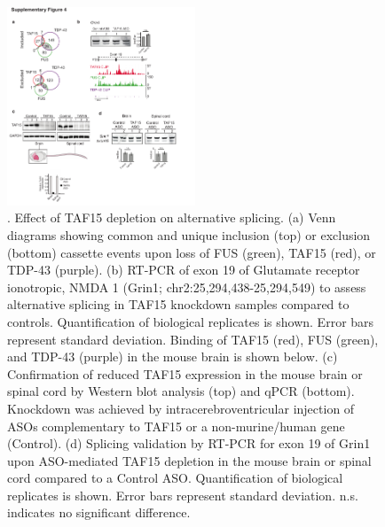 \begin{figure}[ht]
  \centering
  \includegraphics[width=0.5\textwidth]{chapter_2_figures/Figure_S4}
  \caption[Supplementary Figure 4]{. Effect of TAF15 depletion on alternative splicing. (a) Venn diagrams showing common and unique inclusion (top) or exclusion (bottom) cassette events upon loss of FUS (green), TAF15 (red), or TDP-43 (purple). (b) RT-PCR of exon 19 of Glutamate receptor ionotropic, NMDA 1 (Grin1; chr2:25,294,438-25,294,549) to assess alternative splicing in TAF15 knockdown samples compared to controls. Quantification of biological replicates is shown. Error bars represent standard deviation. Binding of TAF15 (red), FUS (green), and TDP-43 (purple) in the mouse brain is shown below. (c) Confirmation of reduced TAF15 expression in the mouse brain or spinal cord by Western blot analysis (top) and qPCR (bottom). Knockdown was achieved by intracerebroventricular injection of ASOs complementary to TAF15 or a non-murine/human gene (Control). (d) Splicing validation by RT-PCR for exon 19 of Grin1 upon ASO-mediated TAF15 depletion in the mouse brain or spinal cord compared to a Control ASO. Quantification of biological replicates is shown. Error bars represent standard deviation. n.s. indicates no significant difference.}
  \label{fig:Figure_S4}
\end{figure}

